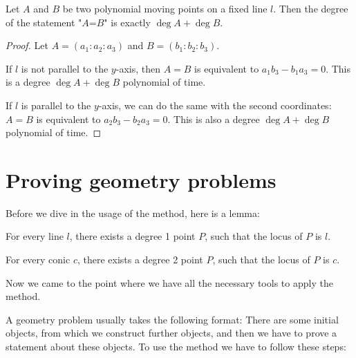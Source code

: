 \documentclass[a4paper]{article}
\begin{document}
\begin{theorem}\label{degab}
    Let $A$ and $B$ be two polynomial moving points on a fixed line $l$. Then the degree of the statement "$A$=$B$" is exactly $\deg A+ \deg B$.
\end{theorem}
\begin{proof}
    Let $A=(a_1:a_2:a_3)$ and $B=(b_1:b_2:b_3)$.

    If $l$ is not parallel to the $y$-axis, then $A=B$ is equivalent to $a_1b_3-b_1a_3=0$. This is a degree $\deg A+\deg B$ polynomial of time.

    If $l$ is parallel to the $y$-axis, we can do the same with the second coordinates: $A=B$ is equivalent to $a_2b_3-b_2a_3=0$. This is also a degree $\deg A+\deg B$ polynomial of time.
\end{proof}







\section{Proving geometry problems}

Before we dive in the usage of the method, here is a lemma:

\begin{lemma}\label{initial moving object}
    For every line $l$, there exists a degree 1 point $P$, such that the locus of $P$ is $l$.

    For every conic $c$, there exists a degree 2 point $P$, such that the locus of $P$ is $c$.
\end{lemma}

Now we came to the point where we have all the necessary tools to apply the method.

A geometry problem usually takes the following format: There are some initial objects, from which we construct further objects, and then we have to prove a statement about these objects. To use the method we have to follow these steps:
\end{document}
